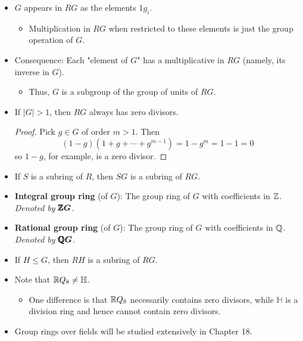 \documentclass[../notes.tex]{subfiles}
\begin{document}
\begin{itemize}
\begin{itemize}
    \end{itemize}
    \item $G$ appears in $RG$ as the elements $1g_i$.
    \begin{itemize}
        \item Multiplication in $RG$ when restricted to these elements is just the group operation of $G$.
    \end{itemize}
    \item Consequence: Each "element of $G$" has a multiplicative in $RG$ (namely, its inverse in $G$).
    \begin{itemize}
        \item Thus, $G$ is a subgroup of the group of units of $RG$.
    \end{itemize}
    \item If $|G|>1$, then $RG$ always has zero divisors.
    \begin{proof}
        Pick $g\in G$ of order $m>1$. Then
        \begin{equation*}
            (1-g)(1+g+\cdots+g^{m-1}) = 1-g^m
            = 1-1
            = 0
        \end{equation*}
        so $1-g$, for example, is a zero divisor.
    \end{proof}
    \item If $S$ is a subring of $R$, then $SG$ is a subring of $RG$.
    \item \textbf{Integral group ring} (of $G$): The group ring of $G$ with coefficients in $\mathbb{Z}$. \emph{Denoted by} $\bm{\pmb{\mathbb{Z}}G}$.
    \item \textbf{Rational group ring} (of $G$): The group ring of $G$ with coefficients in $\mathbb{Q}$. \emph{Denoted by} $\bm{\pmb{\mathbb{Q}}G}$.
    \item If $H\leq G$, then $RH$ is a subring of $RG$.
    \item Note that $\mathbb{R} Q_8\neq\mathbb{H}$.
    \begin{itemize}
        \item One difference is that $\mathbb{R} Q_8$ necessarily contains zero divisors, while $\mathbb{H}$ is a division ring and hence cannot contain zero divisors.
    \end{itemize}
    \item Group rings over fields will be studied extensively in Chapter 18.
\end{itemize}
\end{document}
